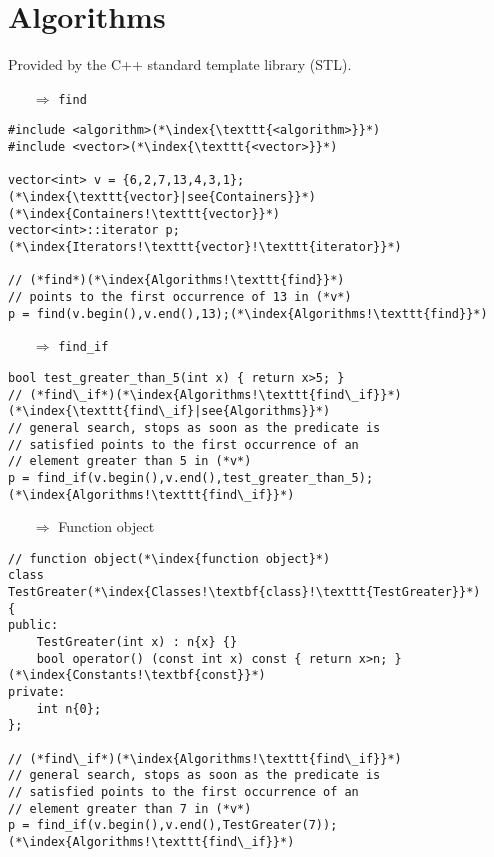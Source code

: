 \documentclass[10pt]{book}
\begin{document}
\section{Algorithms}
\small
Provided by the C++ standard template library (STL).
\begin{enumerate}
\item[$\Rightarrow$]  \texttt{find}
\end{enumerate}
\begin{lstlisting}
#include <algorithm>(*\index{\texttt{<algorithm>}}*)
#include <vector>(*\index{\texttt{<vector>}}*)

vector<int> v = {6,2,7,13,4,3,1};(*\index{\texttt{vector}|see{Containers}}*)(*\index{Containers!\texttt{vector}}*)
vector<int>::iterator p;(*\index{Iterators!\texttt{vector}!\texttt{iterator}}*)

// (*find*)(*\index{Algorithms!\texttt{find}}*)
// points to the first occurrence of 13 in (*v*)
p = find(v.begin(),v.end(),13);(*\index{Algorithms!\texttt{find}}*)
\end{lstlisting}
\begin{enumerate}
\item[$\Rightarrow$]  \texttt{find\_if}
\end{enumerate}
\begin{lstlisting}
bool test_greater_than_5(int x) { return x>5; }
// (*find\_if*)(*\index{Algorithms!\texttt{find\_if}}*)(*\index{\texttt{find\_if}|see{Algorithms}}*)
// general search, stops as soon as the predicate is
// satisfied points to the first occurrence of an
// element greater than 5 in (*v*)
p = find_if(v.begin(),v.end(),test_greater_than_5);(*\index{Algorithms!\texttt{find\_if}}*)
\end{lstlisting}
\begin{enumerate}
\item[$\Rightarrow$] Function object
\end{enumerate}
\begin{lstlisting}
// function object(*\index{function object}*)
class TestGreater(*\index{Classes!\textbf{class}!\texttt{TestGreater}}*)
{
public:
    TestGreater(int x) : n{x} {}
    bool operator() (const int x) const { return x>n; }(*\index{Constants!\textbf{const}}*)
private:
    int n{0};
};

// (*find\_if*)(*\index{Algorithms!\texttt{find\_if}}*)
// general search, stops as soon as the predicate is
// satisfied points to the first occurrence of an
// element greater than 7 in (*v*)
p = find_if(v.begin(),v.end(),TestGreater(7));(*\index{Algorithms!\texttt{find\_if}}*)
\end{lstlisting}
\end{document}

